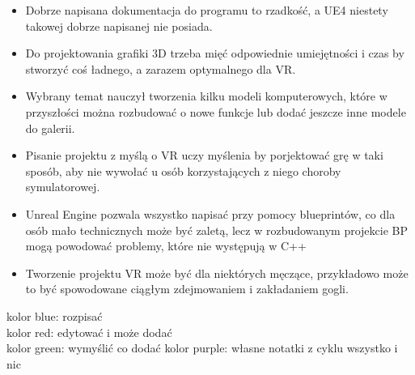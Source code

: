 \documentclass[a4paper,12pt,reqno]{article}
\begin{document}
\begin{itemize}
\item Dobrze napisana dokumentacja do programu to rzadkość, a UE4 niestety takowej dobrze napisanej nie posiada.
\item Do projektowania grafiki 3D trzeba mięć odpowiednie umiejętności i czas by stworzyć coś ładnego, a zarazem optymalnego dla VR.
\item Wybrany temat nauczył tworzenia kilku modeli komputerowych, które w przyszłości można rozbudować o nowe funkcje lub dodać jeszcze inne modele do galerii.
\item Pisanie projektu z myślą o VR uczy myślenia by porjektować grę w taki sposób, aby nie wywołać u osób korzystających z niego choroby symulatorowej.
\item Unreal Engine pozwala wszystko napisać przy pomocy blueprintów, co dla osób mało technicznych może być zaletą, lecz w rozbudowanym projekcie BP mogą powodować problemy, które nie występują w C++
\item Tworzenie projektu VR może być dla niektórych męczące, przykładowo może to być spowodowane ciągłym zdejmowaniem i zakładaniem gogli.
\end{itemize}

\newpage




{\color{blue} kolor blue: rozpisać}\\
{\color{red} kolor red: edytować i może dodać}\\
{\color{green} kolor green: wymyślić co dodać}
{\color{purple} kolor purple: własne notatki z cyklu wszystko i nic}
\end{document}
